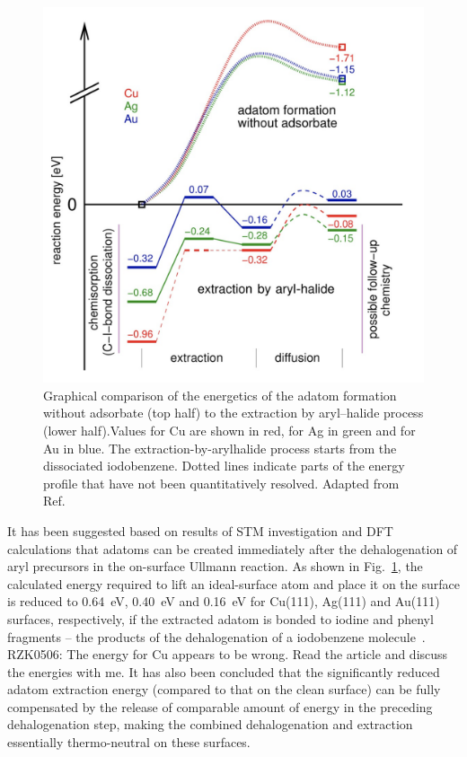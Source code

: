 \documentclass[%
 reprint,
 amsmath,amssymb,
 aps,
prb,
floatfix,
]{revtex4-2}
\newcommand{\lock}{\color{red}}
\newcommand{\lock}{\color{red}}
\newcommand{\comm}{\color{Purple}} %
\begin{document}
\begin{figure}[htb]
\centering
\includegraphics[width=0.75\columnwidth]{Fig/Adatom-formation.png}
\caption{Graphical comparison of the energetics of the adatom formation without adsorbate (top half) to the extraction by aryl–halide process (lower half).Values for Cu are shown in red, for Ag in green and for Au in blue. The extraction-by-arylhalide process starts from the dissociated iodobenzene. Dotted lines indicate parts of the energy profile that have not been quantitatively resolved. Adapted from Ref.~\cite{chemeurope2017}}
\label{fig:3}
\end{figure}

\fi

{\lock

It has been suggested based on results of STM investigation and DFT calculations that adatoms can be created immediately after the dehalogenation of aryl precursors in the on-surface Ullmann reaction. As shown in Fig.~\ref{fig:3}, the calculated energy required to lift an ideal-surface atom and place it on the surface is reduced to \SI{0.64}{\electronvolt}, \SI{0.40}{\electronvolt} and \SI{0.16}{\electronvolt} for Cu(111), Ag(111) and Au(111) surfaces, respectively, if the extracted adatom is bonded to iodine and phenyl fragments -- the products of the dehalogenation of a iodobenzene molecule~\cite{chemeurope2017}. {\comm RZK0506: The energy for Cu appears to be wrong. Read the article and discuss the energies with me.}
%
It has also been concluded that the significantly reduced adatom extraction energy (compared to that on the clean surface) can be fully compensated by the release of comparable amount of energy in the preceding dehalogenation step, making the combined dehalogenation and extraction essentially thermo-neutral on these surfaces.


}
\end{document}
